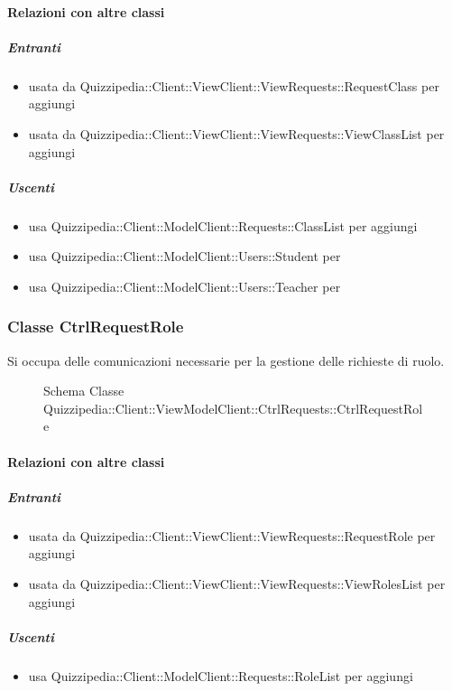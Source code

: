 \paragraph{Relazioni con altre classi}
\subparagraph{Entranti}
\begin{itemize}
\item usata da Quizzipedia::Client::ViewClient::ViewRequests::RequestClass per aggiungi
\item usata da Quizzipedia::Client::ViewClient::ViewRequests::ViewClassList per aggiungi
\end{itemize}
\subparagraph{Uscenti}
\begin{itemize}
\item usa Quizzipedia::Client::ModelClient::Requests::ClassList per aggiungi
\item usa Quizzipedia::Client::ModelClient::Users::Student per 
\item usa Quizzipedia::Client::ModelClient::Users::Teacher per 
\end{itemize}
\subsubsection{Classe CtrlRequestRole}
Si occupa delle comunicazioni necessarie per la gestione delle richieste di ruolo.
\begin{figure}[H]
\centering
\noindent{}
\caption[Schema Classe CtrlRequestRole]{Schema Classe Quizzipedia::Client::ViewModelClient::CtrlRequests::CtrlRequestRole}
\end{figure}
\paragraph{Relazioni con altre classi}
\subparagraph{Entranti}
\begin{itemize}
\item usata da Quizzipedia::Client::ViewClient::ViewRequests::RequestRole per aggiungi
\item usata da Quizzipedia::Client::ViewClient::ViewRequests::ViewRolesList per aggiungi
\end{itemize}
\subparagraph{Uscenti}
\begin{itemize}
\item usa Quizzipedia::Client::ModelClient::Requests::RoleList per aggiungi
\end{itemize}
